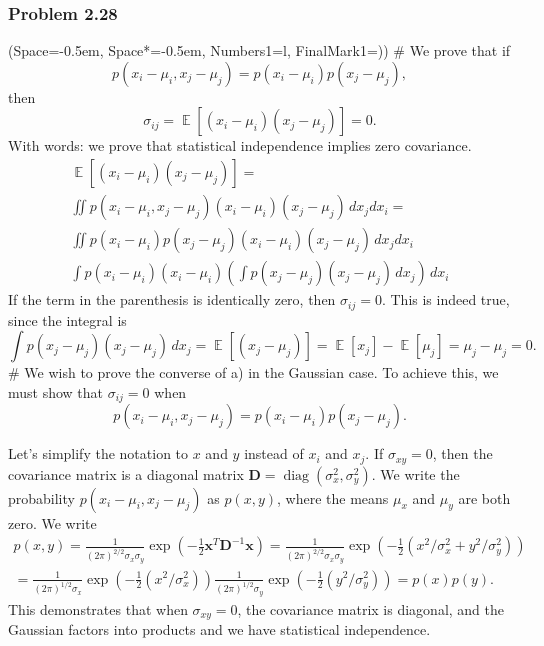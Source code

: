 \documentclass[12pt, a4paper]{article}
\newcommand{\listSpace}{-0.5em}%
\newcommand{\vect}[1]{\bm{#1}}
\DeclareMathOperator{\E}{\mathbb{E}}
\begin{document}
\subsubsection*{Problem 2.28}
\begin{easylist}[enumerate]
\ListProperties(Space=\listSpace, Space*=\listSpace, Numbers1=l, FinalMark1={)})
# We prove that if 
\begin{equation*}
	p(x_i - \mu_i, x_j - \mu_j) = p(x_i - \mu_i) p(x_j - \mu_j),
\end{equation*}
then
\begin{equation*}
\sigma_{ij} = \E \left[ (x_i - \mu_i) (x_j - \mu_j)\right] = 0.
\end{equation*}
With words: we prove that statistical independence implies zero covariance.
\begin{gather*}
	 \E \left[ (x_i - \mu_i) (x_j - \mu_j)\right] = \\
	 \iint p(x_i - \mu_i, x_j - \mu_j) (x_i - \mu_i) (x_j - \mu_j) \, dx_j dx_i = \\
	 \iint  p(x_i - \mu_i) p(x_j - \mu_j) (x_i - \mu_i) (x_j - \mu_j) \, dx_j dx_i \\
	 \int p(x_i - \mu_i) (x_i - \mu_i) \left( 
	 \int p(x_j - \mu_j) (x_j - \mu_j) \, dx_j
	   \right) \, dx_i
\end{gather*}
If the term in the parenthesis is identically zero, then $\sigma_{ij} = 0$.
This is indeed true, since the integral is
\begin{equation*}
	\int p(x_j - \mu_j) (x_j - \mu_j) \, dx_j = \E \left[ (x_j - \mu_j)\right]
	= \E \left[x_j\right] -  \E \left[\mu_j\right] = \mu_j - \mu_j = 0.
\end{equation*}
# We wish to prove the converse of a) in the Gaussian case.
To achieve this, we must show that
$\sigma_{ij} = 0$ when 
\begin{equation*}
	p(x_i - \mu_i, x_j - \mu_j) = p(x_i - \mu_i) p(x_j - \mu_j).
\end{equation*}

Let's simplify the notation to $x$ and $y$ instead of $x_i$ and $x_j$.
If $\sigma_{xy} = 0$, then the covariance matrix is a diagonal matrix $\vect{D} = \operatorname{diag}(\sigma_x^2, \sigma_y^2)$.
We write the probability $p(x_i - \mu_i, x_j - \mu_j)$ as $p(x,y)$, where the means $\mu_x$ and $\mu_y$ are both zero.
We write
\begin{gather*}
	p(x, y) = 
	\frac{1}{(2\pi)^{2/2} \sigma_x \sigma_y} \exp \left( - \frac{1}{2} \vect{x}^T \vect{D}^{-1} \vect{x} \right) = 
	\frac{1}{(2\pi)^{2/2} \sigma_x \sigma_y} \exp \left( - \frac{1}{2} \left( x^2 / \sigma_x^2 + y^2 / \sigma_y^2 \right) \right)  \\
	=  \frac{1}{(2\pi)^{1/2} \sigma_x} \exp \left( - \frac{1}{2} \left( x^2 / \sigma_x^2 \right) \right) 
	\frac{1}{(2\pi)^{1/2} \sigma_y} \exp \left( - \frac{1}{2} \left( y^2 / \sigma_y^2 \right) \right)
	= p(x) p(y).
\end{gather*}
This demonstrates that when $\sigma_{xy} = 0$, the covariance matrix is diagonal, and the Gaussian factors into products and we have statistical independence.


\end{easylist}
\end{document}
